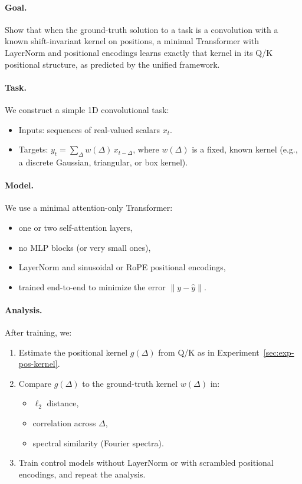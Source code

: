 \documentclass[11pt]{article}
\theoremstyle{definition}
\begin{document}
\paragraph{Goal.}
Show that when the ground-truth solution to a task is a convolution with a known shift-invariant kernel on positions, a minimal Transformer with LayerNorm and positional encodings learns exactly that kernel in its Q/K positional structure, as predicted by the unified framework.

\paragraph{Task.}
We construct a simple 1D convolutional task:
\begin{itemize}
    \item Inputs: sequences of real-valued scalars \(x_t\).
    \item Targets: \(y_t = \sum_{\Delta} w(\Delta)\,x_{t-\Delta}\), where \(w(\Delta)\) is a fixed, known kernel (e.g., a discrete Gaussian, triangular, or box kernel).
\end{itemize}

\paragraph{Model.}
We use a minimal attention-only Transformer:
\begin{itemize}
    \item one or two self-attention layers,
    \item no MLP blocks (or very small ones),
    \item LayerNorm and sinusoidal or RoPE positional encodings,
    \item trained end-to-end to minimize the error \(\|y - \hat{y}\|\).
\end{itemize}

\paragraph{Analysis.}
After training, we:

\begin{enumerate}
    \item Estimate the positional kernel \(g(\Delta)\) from Q/K as in Experiment~\ref{sec:exp-pos-kernel}.
    \item Compare \(g(\Delta)\) to the ground-truth kernel \(w(\Delta)\) in:
    \begin{itemize}
        \item \(\ell_2\) distance,
        \item correlation across \(\Delta\),
        \item spectral similarity (Fourier spectra).
    \end{itemize}
    \item Train control models without LayerNorm or with scrambled positional encodings, and repeat the analysis.
\end{enumerate}
\end{document}
